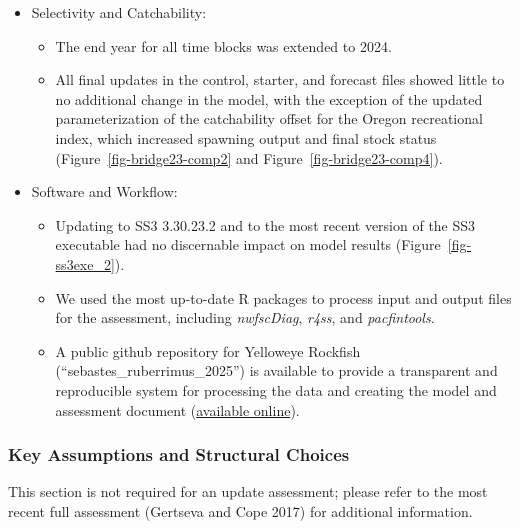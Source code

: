\documentclass[
  english,
]{article}
\providecommand{\tightlist}{%
  \setlength{\itemsep}{0pt}\setlength{\parskip}{0pt}}
\begin{document}
\begin{itemize}
  \begin{itemize}
  \tightlist
  \item
    The control file settings for the bias adjustment were updated to
    improve the fit of the bias adjustment relationship for recruitment
    deviations (Methot and Taylor 2011).
  \end{itemize}
\item
  Selectivity and Catchability:

  \begin{itemize}
  \tightlist
  \item
    The end year for all time blocks was extended to 2024.
  \item
    All final updates in the control, starter, and forecast files showed
    little to no additional change in the model, with the exception of
    the updated parameterization of the catchability offset for the
    Oregon recreational index, which increased spawning output and final
    stock status (Figure~\ref{fig-bridge23-comp2} and
    Figure~\ref{fig-bridge23-comp4}).
  \end{itemize}
\item
  Software and Workflow:

  \begin{itemize}
  \tightlist
  \item
    Updating to SS3 3.30.23.2 and to the most recent version of the SS3
    executable had no discernable impact on model results
    (Figure~\ref{fig-ss3exe_2}).
  \item
    We used the most up-to-date R packages to process input and output
    files for the assessment, including \emph{nwfscDiag}, \emph{r4ss},
    and \emph{pacfintools}.
  \item
    A public github repository for Yelloweye Rockfish
    (``sebastes\_ruberrimus\_2025'') is available to provide a
    transparent and reproducible system for processing the data and
    creating the model and assessment document
    (\href{https://github.com/rclairer/Sebastes_ruberrimus_2025}{available
    online}).
  \end{itemize}
\end{itemize}

\subsubsection{Key Assumptions and Structural
Choices}\label{key-assumptions-and-structural-choices}

This section is not required for an update assessment; please refer to
the most recent full assessment (Gertseva and Cope 2017) for additional
information.
\end{document}
